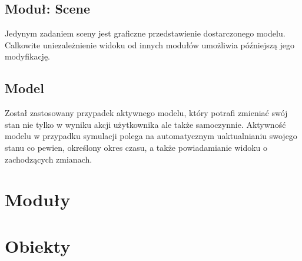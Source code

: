 \subsection {Moduł: Scene}
Jedynym zadaniem sceny jest graficzne przedstawienie dostarczonego modelu.
Calkowite uniezależnienie widoku od innych modułów umożliwia późniejszą jego modyfikację.
\subsection {Model}
Został zastosowany przypadek aktywnego modelu, który potrafi zmieniać swój stan nie tylko w wyniku
akcji użytkownika ale także samoczynnie. Aktywność modelu w przypadku symulacji polega na 
automatycznym uaktualnianiu swojego stanu co pewien, określony okres czasu, a także powiadamianie widoku o 
zachodzących zmianach.

\section {Moduły}
\section {Obiekty}
